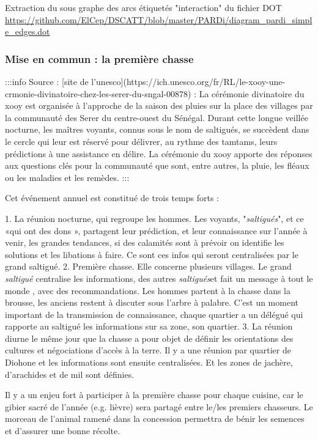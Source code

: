 Extraction du sous graphe des arcs étiquetés  "interaction" du fichier DOT \url{https://github.com/ElCep/DSCATT/blob/master/PARDi/diagram_pardi_simple_edges.dot} 
 
 
 \subsubsection{Mise en commun : la première chasse}
 
:::info 
Source : [site de l'unesco](https://ich.unesco.org/fr/RL/le-xooy-une-crmonie-divinatoire-chez-les-serer-du-sngal-00878) : 
La cérémonie divinatoire du xooy est organisée à l’approche de la saison des pluies sur la place des villages par la communauté des Serer du centre-ouest du Sénégal. Durant cette longue veillée nocturne, les maîtres voyants, connus sous le nom de saltigués, se succèdent dans le cercle qui leur est réservé pour délivrer, au rythme des tamtams, leurs prédictions à une assistance en délire. La cérémonie du xooy apporte des réponses aux questions clés pour la communauté que sont, entre autres, la pluie, les fléaux ou les maladies et les remèdes. 
:::

Cet événement annuel est constitué de trois temps forts : 

1. La réunion nocturne, qui regroupe les hommes. Les voyants, "\textit{saltigués}", et ce «qui ont des dons », partagent leur prédiction, et leur connaissance sur l'année à venir, les grandes tendances, si des calamités sont à prévoir on identifie les solutions et les libations à faire. Ce sont ces infos qui seront centralisées par le grand saltigué.
2. Première chasse. Elle concerne plusieurs villages.  Le grand \textit{saltigué} centralise les informations, des autres \textit{saltigués}et fait un message à tout le monde , avec des recommandations. Les hommes partent à la chasse dans la brousse, les anciens restent à discuter sous l'arbre à palabre. C'est un moment important de la transmission de connaissance, chaque quartier a un délégué qui rapporte au saltigué les informations sur sa zone, son quartier. 
3. La réunion diurne le même jour que la chasse a pour objet de définir les orientations des cultures et négociations d'accès à la terre. Il y a une réunion par quartier de Diohone et les informations sont ensuite centralisées. Et les zones de jachère, d'arachides et de mil sont définies.


Il y a un enjeu fort à participer à la première chasse pour chaque cuisine, car le gibier sacré de l'année (e.g. lièvre) sera partagé entre le/les premiers chasseurs. Le morceau de l'animal ramené dans la concession permettra de bénir les semences et d'assurer une bonne récolte.

